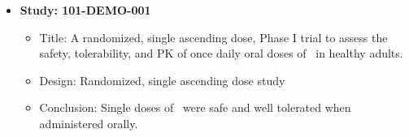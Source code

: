 \begin{itemize}
\item
\textbf{Study: 101-DEMO-001}
\begin{itemize}
\item
Title: A randomized, single ascending dose, Phase I trial to assess the safety, 
tolerability, and \gls{PK} of once daily oral doses of \drugx\ in healthy adults.

\item
Design: Randomized, single ascending dose study
\item
Conclusion: Single doses of \drugx\ were safe and well tolerated when administered orally.

\end{itemize}
\end{itemize}

